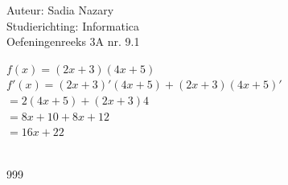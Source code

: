 \documentclass[a4paper]{article}
\begin{document}
\noindent \large Auteur: Sadia Nazary \\
\noindent \large Studierichting: Informatica \\
\noindent \large Oefeningenreeks 3A nr. 9.1 \\

\medskip

\normalsize

$f(x)=(2x+3)(4x+5)$ \\

$f'(x)=(2x+3)'(4x+5)+(2x+3)(4x+5)'$ \\

$=2(4x+5)+(2x+3)4$ \\

$=8x+10+8x+12$ \\

$=16x+22$ \\

 \\

\begin{thebibliography}{999}
\end{thebibliography}
\end{document}
